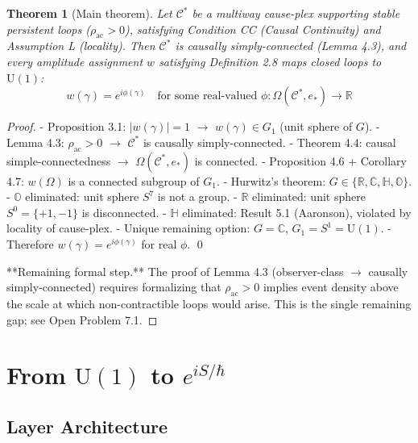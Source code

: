 \documentclass[11pt]{article}
\newtheorem{theorem}{Theorem}[section]
\theoremstyle{definition}
\theoremstyle{remark}
\begin{document}
\begin{theorem}[Main theorem]
\label{theorem:5-2}
Let $\mathcal{C}^{*}$ be a multiway cause-plex supporting stable persistent loops ($\rho_{\mathrm{ac}} > 0$), satisfying Condition CC (Causal Continuity) and Assumption L (locality). Then $\mathcal{C}^{*}$ is causally simply-connected (Lemma 4.3), and every amplitude assignment $w$ satisfying Definition 2.8 maps closed loops to $\mathrm{U}(1)$:
$$w(\gamma) = e^{i\phi(\gamma)} \quad \text{for some real-valued } \phi: \Omega(\mathcal{C}^{\ast}, e_{\ast}) \to \mathbb{R}$$
\end{theorem}

\begin{proof}
- Proposition 3.1: $|w(\gamma)| = 1$ $\to$ $w(\gamma) \in G_1$ (unit sphere of $G$).
- Lemma 4.3: $\rho_{\mathrm{ac}} > 0$ $\to$ $\mathcal{C}^{\ast}$ is causally simply-connected.
- Theorem 4.4: causal simple-connectedness $\to$ $\Omega(\mathcal{C}^{\ast}, e_{\ast})$ is connected.
- Proposition 4.6 + Corollary 4.7: $w(\Omega)$ is a connected subgroup of $G_1$.
- Hurwitz's theorem: $G \in \{\mathbb{R}, \mathbb{C}, \mathbb{H}, \mathbb{O}\}$.
- $\mathbb{O}$ eliminated: unit sphere $S^7$ is not a group.
- $\mathbb{R}$ eliminated: unit sphere $S^0 = \{+1,-1\}$ is disconnected.
- $\mathbb{H}$ eliminated: Result 5.1 (Aaronson), violated by locality of cause-plex.
- Unique remaining option: $G = \mathbb{C}$, $G_1 = S^1 = \mathrm{U}(1)$.
- Therefore $w(\gamma) = e^{i\phi(\gamma)}$ for real $\phi$. \qed

**Remaining formal step.** The proof of Lemma 4.3 (observer-class $\to$ causally simply-connected) requires formalizing that $\rho_{\mathrm{ac}} > 0$ implies event density above the scale at which non-contractible loops would arise. This is the single remaining gap; see Open Problem 7.1.
\end{proof}

\medskip

\section{\texorpdfstring{From \(\mathrm{U}(1)\) to
\(e^{iS/\hbar}\)}{From \textbackslash mathrm\{U\}(1) to e\^{}\{iS/\textbackslash hbar\}}}\label{from-mathrmu1-to-eishbar}

\subsection{Layer Architecture}\label{layer-architecture}
\end{document}
